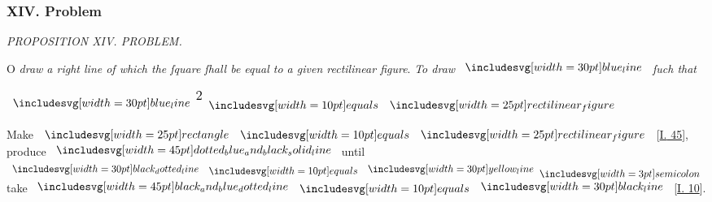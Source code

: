 \documentclass[11pt,preview]{standalone}
\begin{document}
\subsubsection{XIV. Problem}

\begin{minipage}[t]{0.43\textwidth}
    \vspace{0pt}
    
\end{minipage}%
\hfill
\begin{minipage}[t]{0.54\textwidth}
    \begin{center}
        \textit{PROPOSITION XIV. PROBLEM.}\label{book2pr14} \\
    \end{center}

    \hfill

    \begin{center}
        \raggedright \lettrine[lines=3, loversize=1, nindent=0pt]{}{}O \textit{draw a right line of which the ſquare ſhall be equal to a given rectilinear figure}. \textit{To draw} $\blueline$ \textit{ſuch that}
    \end{center}
    \centerline{$\blueline^{\text{\large 2}} \bequals \img{rectilinear_figure}$}
\end{minipage}

\hfill

\begin{center}
    Make $\img{rectangle} \bequals \img{rectilinear_figure}$ [\hyperref[book1pr45]{\textsc{I.} 45}],\\
    produce $\bimg{dotted_blue_and_black_solid_line}$ until $\dottedblackline \bequals \yellowline \bsemicolon$\\
    take $\bimg{black_and_blue_dotted_line} \bequals \blackline$ [\hyperref[book1pr10]{\textsc{I.} 10}].\\
\end{center}

\hfill
\end{document}
